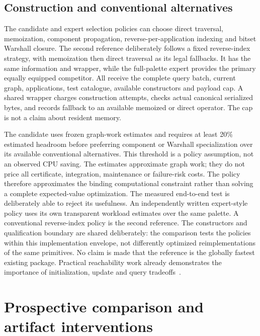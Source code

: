 \documentclass[11pt,letterpaper]{article}
\begin{document}
\subsection{Construction and conventional alternatives}

The candidate and expert selection policies can choose direct traversal, memoization, component propagation, reverse-per-application indexing and bitset Warshall closure. The second reference deliberately follows a fixed reverse-index strategy, with memoization then direct traversal as its legal fallbacks. It has the same information and wrapper, while the full-palette expert provides the primary equally equipped competitor. All receive the complete query batch, current graph, applications, test catalogue, available constructors and payload cap. A shared wrapper charges construction attempts, checks actual canonical serialized bytes, and records fallback to an available memoized or direct operator. The cap is not a claim about resident memory.

The candidate uses frozen graph-work estimates and requires at least 20\% estimated headroom before preferring component or Warshall specialization over its available conventional alternatives. This threshold is a policy assumption, not an observed CPU saving. The estimates approximate graph work; they do not price all certificate, integration, maintenance or failure-risk costs. The policy therefore approximates the binding computational constraint rather than solving a complete expected-value optimization. The measured end-to-end test is deliberately able to reject its usefulness. An independently written expert-style policy uses its own transparent workload estimates over the same palette. A conventional reverse-index policy is the second reference. The constructors and qualification boundary are shared deliberately: the comparison tests the policies within this implementation envelope, not differently optimized reimplementations of the same primitives. No claim is made that the reference is the globally fastest existing package. Practical reachability work already demonstrates the importance of initialization, update and query tradeoffs~\cite{hanauer2020dynamic}.

\section{Prospective comparison and artifact interventions}
\label{sec:bloom-methods}
\end{document}
